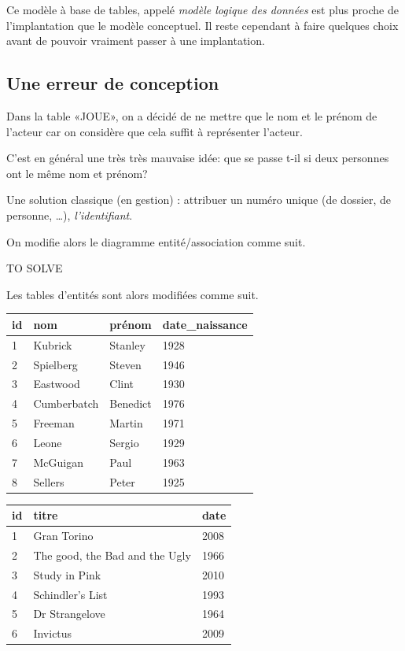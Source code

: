 Ce modèle à  base de tables, appelé \emph{modèle  logique des données}
est plus proche  de l'implantation que le modèle  conceptuel. Il reste
cependant à  faire quelques choix  avant de pouvoir vraiment  passer à
une implantation.

\subsection{Une erreur de conception}

Dans la table «JOUE», on a décidé de ne mettre que le nom et le prénom
de l'acteur car on considère que cela suffit à représenter l'acteur.

C'est en général une très très mauvaise idée: que se passe t-il si
deux personnes ont le même nom et prénom?

Une solution classique (en gestion) : attribuer un numéro unique (de
dossier, de personne, \ldots{}), \emph{l'identifiant}.

On modifie alors le diagramme entité/association comme suit. 
\begin{center}
TO SOLVE %
\end{center}

Les tables d'entités sont alors modifiées comme suit.
\begin{center}
\begin{tabular}{llll}
\toprule
id & nom & prénom & date\_naissance\\
\midrule
1&Kubrick&Stanley&1928\\
2&Spielberg & Steven& 1946\\
3&Eastwood & Clint& 1930\\
4&Cumberbatch & Benedict & 1976\\
5&Freeman & Martin& 1971\\
6&Leone & Sergio & 1929 \\
7&McGuigan & Paul & 1963\\
8& Sellers&Peter&1925\\
\bottomrule
\end{tabular}
\end{center}

\begin{center}
\begin{tabular}{lll}
\toprule
id & titre & date\\
\midrule
1 & Gran Torino & 2008\\
2 & The good, the Bad and the Ugly& 1966\\
3 & Study in Pink & 2010\\
4 & Schindler's List& 1993\\
5 & Dr Strangelove&1964\\
6 & Invictus & 2009\\
\bottomrule
\end{tabular}
\end{center}

